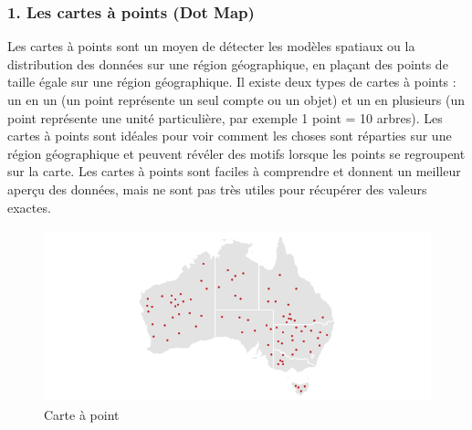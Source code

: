 \documentclass[french, a4paper, 12pt]{report}
\begin{document}
\subsubsection{1. Les cartes à points (Dot Map)}
Les cartes à points sont un moyen de détecter les modèles spatiaux ou la distribution des données sur une région géographique, en plaçant des points de taille égale sur une région géographique.
Il existe deux types de cartes à points : un en un (un point représente un seul compte ou un objet) et un en plusieurs (un point représente une unité particulière, par exemple 1 point = 10 arbres).
Les cartes à points sont idéales pour voir comment les choses sont réparties sur une région géographique et peuvent révéler des motifs lorsque les points se regroupent sur la carte. Les cartes à points sont faciles à comprendre et donnent un meilleur aperçu des données, mais ne sont pas très utiles pour récupérer des valeurs exactes.
\begin{figure}[!ht]
    \centering
    \includegraphics[height=5cm]{images/dot_map.png}
    \caption{Carte à point \footnotemark}
    \label{fig:2.4}
\end{figure}
\end{document}
